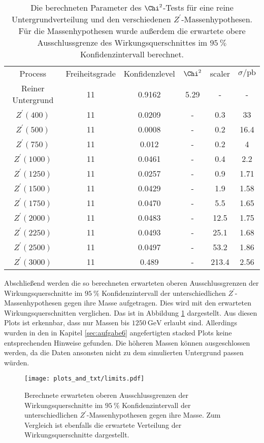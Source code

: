 \begin{table}
  \centering
  \caption{Die berechneten Parameter des $\Chi^2$-Tests für eine reine Untergrundverteilung und den verschiedenen $Z^\prime$-Massenhypothesen. Für die Massenhypothesen wurde außerdem die erwartete obere Ausschlussgrenze des Wirkungsquerschnittes im $\SI{95}{\percent}$ Konfidenzintervall berechnet.}
  \label{tab:chi2}
  \begin{tabular}{c|ccccc}
    \toprule
    Process & Freiheitsgrade & Konfidenzlevel & $\Chi^2$ & scaler & $\sigma / \si{\pico\barn}$ \\
    Reiner Untergrund & 11 & 0.9162 & 5.29 & - & - \\
    $Z^\prime (400)$  & 11 & 0.0209 & - & 0.3 & 33 \\
    $Z^\prime (500)$  & 11 & 0.0008 & - & 0.2 & 16.4 \\
    $Z^\prime (750)$  & 11 & 0.012 & - & 0.2 & 4 \\
    $Z^\prime (1000)$ & 11 & 0.0461 & - & 0.4 & 2.2 \\
    $Z^\prime (1250)$ & 11 & 0.0257 & - & 0.9 & 1.71 \\
    $Z^\prime (1500)$ & 11 & 0.0429 & - & 1.9 & 1.58 \\
    $Z^\prime (1750)$ & 11 & 0.0470 & - & 5.5 & 1.65 \\
    $Z^\prime (2000)$ & 11 & 0.0483 & - & 12.5 & 1.75 \\
    $Z^\prime (2250)$ & 11 & 0.0493 & - & 25.1 & 1.68 \\
    $Z^\prime (2500)$ & 11 & 0.0497 & - & 53.2 & 1.86 \\
    $Z^\prime (3000)$ & 11 & 0.489 & - & 213.4 & 2.56 \\
    \midrule
    \bottomrule
  \end{tabular}
\end{table}

Abschließend werden die so berechneten erwarteten oberen Ausschlussgrenzen der Wirkungsquerschnitte im $\SI{95}{\percent}$ Konfidenzintervall der unterschiedlichen $Z^\prime$-Massenhypothesen gegen ihre Masse aufgetragen.
Dies wird mit den erwarteten Wirkungsquerschnitten verglichen.
Das ist in Abbildung \ref{fig:limit} dargestellt.
Aus diesen Plots ist erkennbar, dass nur Massen bis $\SI{1250}{\giga\electronvolt}$ erlaubt sind.
Allerdings wurden in den in Kapitel \ref{sec:aufgabe6} angefertigten stacked Plots keine entsprechenden Hinweise gefunden.
Die höheren Massen können ausgeschlossen werden, da die Daten ansonsten nicht zu dem simulierten Untergrund passen würden.

\begin{figure}
    \centering
    \texttt{[image: plots\_and\_txt/limits.pdf]}
    \caption{Berechnete erwarteten oberen Ausschlussgrenzen der Wirkungsquerschnitte im $\SI{95}{\percent}$ Konfidenzintervall der unterschiedlichen $Z^\prime$-Massenhypothesen gegen ihre Masse. Zum Vergleich ist ebenfalls die erwartete Verteilung der Wirkungsquerschnitte dargestellt.}
    \label{fig:limit}
\end{figure}
